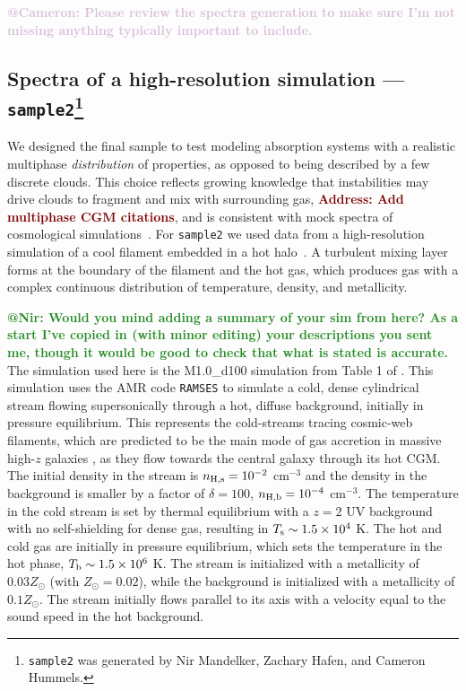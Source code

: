\documentclass[fleqn,usenatbib]{mnras}
\makeatletter
\newcommand{\todo}[1]{\textcolor{Maroon}{\textbf{Address: #1}}}
\newcommand{\atcameron}[1]{\textcolor{Thistle}{\textbf{@Cameron: #1}}}
\newcommand{\atnir}[1]{\textcolor{ForestGreen}{\textbf{@Nir: #1}}}
\makeatother
\begin{document}
\atcameron{Please review the spectra generation to make sure I'm not missing anything typically important to include.}

\subsection[Spectra of a high-resolution simulation --- \texttt{sample2}]{Spectra of a high-resolution simulation --- \texttt{sample2}\footnote{
\texttt{sample2} was generated by Nir Mandelker, Zachary Hafen, and Cameron Hummels.}}
\label{s: data generation -- sample2}

We designed the final sample to test modeling absorption systems with a realistic multiphase \textit{distribution} of properties, as opposed to being described by a few discrete clouds.
This choice reflects growing knowledge that instabilities may drive clouds to fragment and mix with surrounding gas, \todo{Add multiphase CGM citations}, and is consistent with mock spectra of cosmological simulations~\citep[e.g.][]{Marra2022}.
For \texttt{sample2} we used data from a high-resolution simulation of a cool filament embedded in a hot halo~\citep{Mandelker2020a}.
A turbulent mixing layer forms at the boundary of the filament and the hot gas, which produces gas with a complex continuous distribution of temperature, density, and metallicity.

\atnir{Would you mind adding a summary of your sim from \cite{Mandelker2020a} here? As a start I've copied in (with minor editing) your descriptions you sent me, though it would be good to check that what is stated is accurate.}
The simulation used here is the M1.0\_d100 simulation from Table 1 of \cite{Mandelker2020a}.
This simulation uses the AMR code \texttt{RAMSES} \citep{Teyssier2002} to simulate a cold, dense cylindrical stream flowing supersonically through a hot, diffuse background, initially in pressure equilibrium.
This represents the cold-streams tracing cosmic-web filaments, which are predicted to be the main mode of gas accretion in massive high-$z$ galaxies \citep{Dekel2009}, as they flow towards the central galaxy through its hot CGM.
The initial density in the stream is $n_{\rm H,s}=10^{-2}$ cm$^{-3}$ and the density in the background is smaller by a factor of $\delta=100$, $n_{\rm H,b}=10^{-4}$ cm$^{-3}$.
The temperature in the cold stream is set by thermal equilibrium with a $z=2$ \cite{Haardt1996} UV background with no self-shielding for dense gas, resulting in $T_{\rm s}\sim 1.5 \times 10^4$ K.
The hot and cold gas are initially in pressure equilibrium, which sets the temperature in the hot phase, $T_{\rm b}\sim 1.5 \times 10^6$ K.
The stream is initialized with a metallicity of $0.03 Z_\odot$ (with $Z_\odot = 0.02$), while the background is initialized with a metallicity of $0.1 Z_\odot$.
The stream initially flows parallel to its axis with a velocity equal to the sound speed in the hot background.
\end{document}
